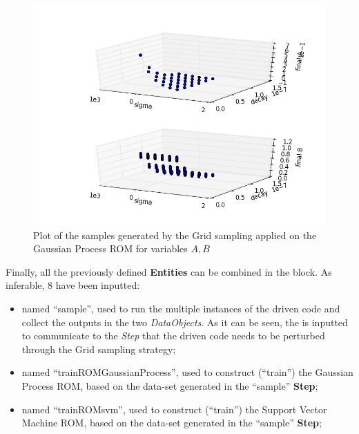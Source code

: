 \begin{enumerate}
\begin{figure}[h!]
 \end{figure}
 \begin{figure}[h!]
  \centering
  \includegraphics[scale=0.7]{pics/samplesPlot3DROMgp_scatter-scatter.png}
  \caption{Plot of the samples generated by the Grid sampling applied on the Gaussian Process ROM for variables $A,B$}
  \label{fig:ROMgp_samples}
 \end{figure}
   Finally, all the previously defined \textbf{Entities} can be combined in 
   the  block. As inferable, 
   8  have been inputted:
   \begin{itemize}
     \item {} named ``sample'', used to run the multiple  
     instances of the driven code and 
     collect the outputs in the two \textit{DataObjects}. As it can be
     seen, the  is inputted to communicate to the 
     \textit{Step} that the driven code needs to
     be perturbed through the Grid sampling strategy;
     \item {} named ``trainROMGaussianProcess'', used to construct (``train'')
     the Gaussian Process ROM, based on the data-set generated in the  ``sample'' \textbf{Step};
     \item {} named ``trainROMsvm'', used to construct (``train'')
     the Support Vector Machine ROM, based on the data-set generated in the  ``sample'' \textbf{Step};

\end{itemize}
\end{enumerate}
